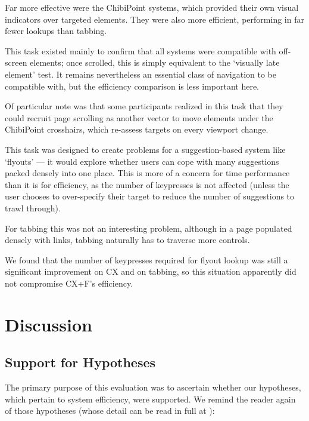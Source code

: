 \documentclass[a4paper, 12pt]{report}
\begin{document}
Far more effective were the ChibiPoint systems, which provided their own visual indicators over targeted elements. They were also more efficient, performing in far fewer lookups than tabbing.

This task existed mainly to confirm that all systems were compatible with off-screen elements; once scrolled, this is simply equivalent to the `visually late element' test. It remains nevertheless an essential class of navigation to be compatible with, but the efficiency comparison is less important here.

Of particular note was that some participants realized in this task that they could recruit page scrolling as another vector to move elements under the ChibiPoint crosshairs, which re-assess targets on every viewport change.

This task was designed to create problems for a suggestion-based system like `flyouts' --- it would explore whether users can cope with many suggestions packed densely into one place. This is more of a concern for time performance than it is for efficiency, as the number of keypresses is not affected (unless the user chooses to over-specify their target to reduce the number of suggestions to trawl through).

For tabbing this was not an interesting problem, although in a page populated densely with links, tabbing naturally has to traverse more controls.

We found that the number of keypresses required for flyout lookup was still a significant improvement on CX and on tabbing, so this situation apparently did not compromise CX+F's efficiency.

\section{Discussion}
\subsection{Support for Hypotheses}
The primary purpose of this evaluation was to ascertain whether our hypotheses, which pertain to system efficiency, were supported. We remind the reader again of those hypotheses (whose detail can be read in full at ):

\textbf{\hypone}\\
\textbf{\hyptwo}\\
\end{document}
